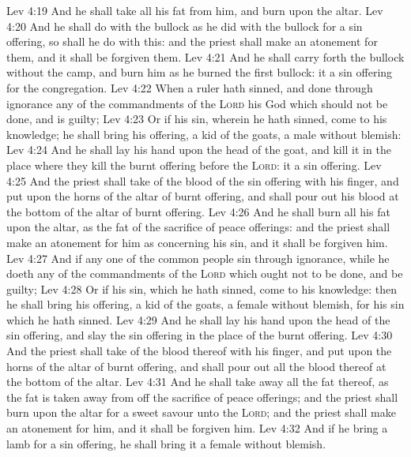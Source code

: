\vs Lev 4:19 And he shall take all his fat from him, and burn  upon the altar.
\vs Lev 4:20 And he shall do with the bullock as he did with the bullock for a sin offering, so shall he do with this: and the priest shall make an atonement for them, and it shall be forgiven them.
\vs Lev 4:21 And he shall carry forth the bullock without the camp, and burn him as he burned the first bullock: it  a sin offering for the congregation.
\vs Lev 4:22 When a ruler hath sinned, and done  through ignorance  any of the commandments of the \textsc{Lord} his God  which should not be done, and is guilty;
\vs Lev 4:23 Or if his sin, wherein he hath sinned, come to his knowledge; he shall bring his offering, a kid of the goats, a male without blemish:
\vs Lev 4:24 And he shall lay his hand upon the head of the goat, and kill it in the place where they kill the burnt offering before the \textsc{Lord}: it  a sin offering.
\vs Lev 4:25 And the priest shall take of the blood of the sin offering with his finger, and put  upon the horns of the altar of burnt offering, and shall pour out his blood at the bottom of the altar of burnt offering.
\vs Lev 4:26 And he shall burn all his fat upon the altar, as the fat of the sacrifice of peace offerings: and the priest shall make an atonement for him as concerning his sin, and it shall be forgiven him.
\vs Lev 4:27 And if any one of the common people sin through ignorance, while he doeth  any of the commandments of the \textsc{Lord}  which ought not to be done, and be guilty;
\vs Lev 4:28 Or if his sin, which he hath sinned, come to his knowledge: then he shall bring his offering, a kid of the goats, a female without blemish, for his sin which he hath sinned.
\vs Lev 4:29 And he shall lay his hand upon the head of the sin offering, and slay the sin offering in the place of the burnt offering.
\vs Lev 4:30 And the priest shall take of the blood thereof with his finger, and put  upon the horns of the altar of burnt offering, and shall pour out all the blood thereof at the bottom of the altar.
\vs Lev 4:31 And he shall take away all the fat thereof, as the fat is taken away from off the sacrifice of peace offerings; and the priest shall burn  upon the altar for a sweet savour unto the \textsc{Lord}; and the priest shall make an atonement for him, and it shall be forgiven him.
\vs Lev 4:32 And if he bring a lamb for a sin offering, he shall bring it a female without blemish.
